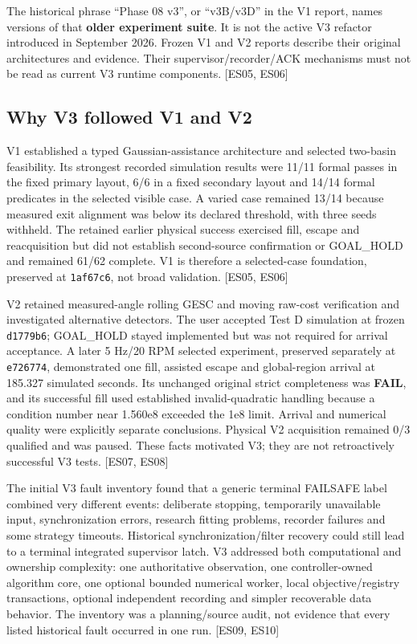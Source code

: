 \documentclass[
  10pt,
  letterpaper,
]{article}
\newcommand{\passthrough}[1]{#1}
\begin{document}
The historical phrase ``Phase 08 v3'', or ``v3B/v3D'' in the V1 report,
names versions of that \textbf{older experiment suite}. It is not the
active V3 refactor introduced in September 2026. Frozen V1 and V2
reports describe their original architectures and evidence. Their
supervisor/recorder/ACK mechanisms must not be read as current V3
runtime components. {[}ES05, ES06{]}

\subsection{Why V3 followed V1 and V2}\label{why-v3-followed-v1-and-v2}

V1 established a typed Gaussian-assistance architecture and selected
two-basin feasibility. Its strongest recorded simulation results were
11/11 formal passes in the fixed primary layout, 6/6 in a fixed
secondary layout and 14/14 formal predicates in the selected visible
case. A varied case remained 13/14 because measured exit alignment was
below its declared threshold, with three seeds withheld. The retained
earlier physical success exercised fill, escape and reacquisition but
did not establish second-source confirmation or GOAL\_HOLD and remained
61/62 complete. V1 is therefore a selected-case foundation, preserved at
\passthrough{\lstinline!1af67c6!}, not broad validation. {[}ES05,
ES06{]}

V2 retained measured-angle rolling GESC and moving raw-cost verification
and investigated alternative detectors. The user accepted Test D
simulation at frozen \passthrough{\lstinline!d1779b6!}; GOAL\_HOLD
stayed implemented but was not required for arrival acceptance. A later
5 Hz/20 RPM selected experiment, preserved separately at
\passthrough{\lstinline!e726774!}, demonstrated one fill, assisted
escape and global-region arrival at 185.327 simulated seconds. Its
unchanged original strict completeness was \textbf{FAIL}, and its
successful fill used established invalid-quadratic handling because a
condition number near 1.560e8 exceeded the 1e8 limit. Arrival and
numerical quality were explicitly separate conclusions. Physical V2
acquisition remained 0/3 qualified and was paused. These facts motivated
V3; they are not retroactively successful V3 tests. {[}ES07, ES08{]}

The initial V3 fault inventory found that a generic terminal FAILSAFE
label combined very different events: deliberate stopping, temporarily
unavailable input, synchronization errors, research fitting problems,
recorder failures and some strategy timeouts. Historical
synchronization/filter recovery could still lead to a terminal
integrated supervisor latch. V3 addressed both computational and
ownership complexity: one authoritative observation, one
controller-owned algorithm core, one optional bounded numerical worker,
local objective/registry transactions, optional independent recording
and simpler recoverable data behavior. The inventory was a
planning/source audit, not evidence that every listed historical fault
occurred in one run. {[}ES09, ES10{]}
\end{document}
